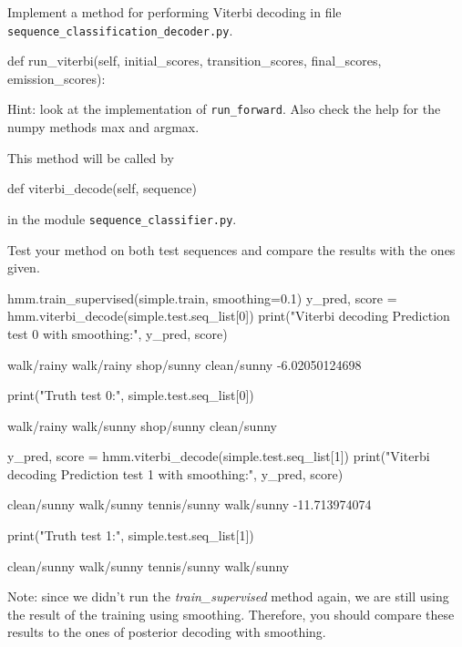 \begin{exercise}
Implement a method 
for performing Viterbi decoding in 
file {\tt sequence\_classification\_decoder.py}.
\begin{python}
        def run_viterbi(self, initial_scores, transition_scores, final_scores, emission_scores):
\end{python}
Hint: look at the implementation of {\tt run\_forward}. Also check the help for the numpy methods max and argmax.

This method will be called 
by 
\begin{python}
def viterbi_decode(self, sequence)
\end{python}
in the module {\tt sequence\_classifier.py}.
%

Test your method on both test sequences and compare the results with
the ones given.
\begin{python}
hmm.train_supervised(simple.train, smoothing=0.1)
y_pred, score = hmm.viterbi_decode(simple.test.seq_list[0])
print("Viterbi decoding Prediction test 0 with smoothing:", y_pred, score)

walk/rainy walk/rainy shop/sunny clean/sunny  -6.02050124698

print("Truth test 0:", simple.test.seq_list[0])

walk/rainy walk/sunny shop/sunny clean/sunny 

y_pred, score = hmm.viterbi_decode(simple.test.seq_list[1])
print("Viterbi decoding Prediction test 1 with smoothing:", y_pred, score)

clean/sunny walk/sunny tennis/sunny walk/sunny  -11.713974074

print("Truth test 1:", simple.test.seq_list[1])

clean/sunny walk/sunny tennis/sunny walk/sunny 
\end{python}

Note: since we didn't run the \emph{train\_supervised} method again, we are still using the result of the training using smoothing. Therefore, you should compare these results to the ones of posterior decoding with smoothing.

\end{exercise}




